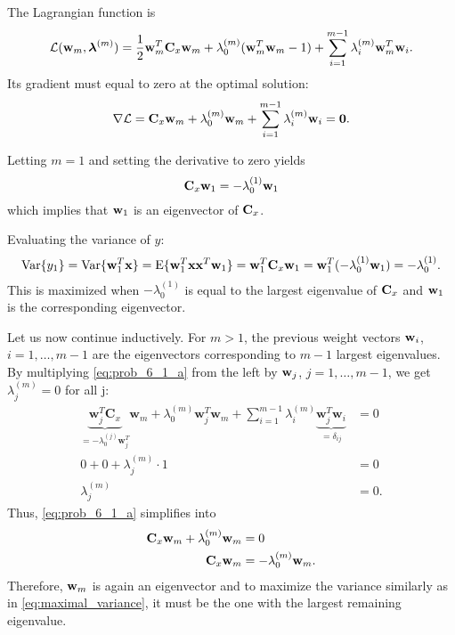 \begin{enumerate}
\begin{solution}
    The Lagrangian function is
    \begin{equation*}
      {\cal L}(\mathbf{w}_m, \boldsymbol{\lambda}^{(m)}) = \frac{1}{2} \mathbf{w}_m^T  \mathbf{C}_x \mathbf{w}_m
      + \lambda_0^{(m)} ( \mathbf{w}_m^T \mathbf{w}_m - 1) + \sum_{i=1}^{m-1} \lambda_i^{(m)} \mathbf{w}_m^T \mathbf{w}_i.
    \end{equation*}
    Its gradient must equal to zero at the optimal solution:
    \begin{equation}
      \label{eq:prob_6_1_a}
      \nabla {\cal L} = {\bf{C}}_x \mathbf{w}_m + \lambda_0^{(m)} \mathbf{w}_m
      + \sum_{i=1}^{m-1} \lambda_i^{(m)} \mathbf{w}_i = \mathbf{0}.
    \end{equation}

    Letting $m=1$ and setting the derivative to zero yields
    \begin{equation*}
      \mathbf{C}_x \mathbf{w}_1 = - \lambda_0^{(1)} \mathbf{w}_1
    \end{equation*}
    which implies that $\mathbf{w}_1$ is an eigenvector of $\mathbf{C}_x$.

    Evaluating the variance of $y$:
    \begin{equation}
      \operatorname{Var}\{ y_1 \} = \operatorname{Var}\{ \mathbf{w}_1^T \mathbf{x} \} = \operatorname{E}\{ \mathbf{w}_1^T \mathbf{x} \mathbf{x}^T \mathbf{w}_1 \}
      = \mathbf{w}_1^T \mathbf{C}_x \mathbf{w}_1 = \mathbf{w}_1^T (- \lambda_0^{(1)} \mathbf{w}_1) = -
      \lambda_0^{(1)}.
      \label{eq:maximal_variance}
    \end{equation}
    This is maximized when $- \lambda_0^{(1)}$ is equal to the largest
    eigenvalue of $\mathbf{C}_x$ and $\mathbf{w}_1$ is the corresponding eigenvector.

    Let us now continue inductively.  For $m>1$, the previous weight
    vectors $\mathbf{w}_i$, $i = 1, \dots, m-1$ are the eigenvectors
    corresponding to $m-1$ largest eigenvalues.  By multiplying
    \eqref{eq:prob_6_1_a} from the left by $\mathbf{w}_j$, $j = 1, \dots,
    m-1$, we get $\lambda_j^{(m)} = 0$ for all j:
    \begin{align*}
      \underbrace{\mathbf{w}_j^T
        \mathbf{C}_x}_{=-\lambda_0^{(j)}\mathbf{w}_j^T} \mathbf{w}_m +
      \lambda_0^{(m)} \mathbf{w}_j^T \mathbf{w}_m + \sum^{m-1}_{i=1}
      \lambda_i^{(m)} \underbrace{ \mathbf{w}^T_j \mathbf{w}_i
      }_{=\delta_{ij}} &= 0
      \\
      0 + 0 + \lambda_j^{(m)} \cdot 1 &= 0
      \\
      \lambda_j^{(m)} &= 0.
    \end{align*}
    Thus, \eqref{eq:prob_6_1_a} simplifies into
    \begin{align*}
      \mathbf{C}_x \mathbf{w}_m + \lambda_0^{(m)} \mathbf{w}_m &= 0
      \\
      \mathbf{C}_x \mathbf{w}_m &= - \lambda_0^{(m)} \mathbf{w}_m.
    \end{align*}
    Therefore, $\mathbf{w}_m$ is again an eigenvector and to maximize the
    variance similarly as in \eqref{eq:maximal_variance}, it must be
    the one with the largest remaining eigenvalue.


\end{solution}
\end{enumerate}
